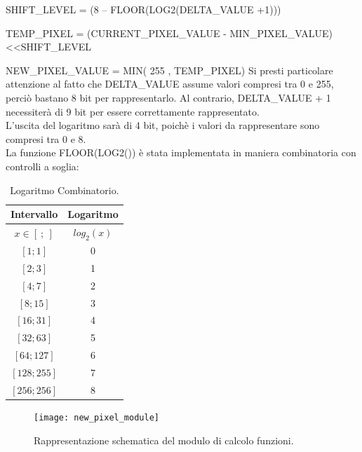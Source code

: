 SHIFT\_LEVEL = (8 – FLOOR(LOG2(DELTA\_VALUE +1)))

TEMP\_PIXEL = (CURRENT\_PIXEL\_VALUE - MIN\_PIXEL\_VALUE) \textless\textless SHIFT\_LEVEL

NEW\_PIXEL\_VALUE = MIN( 255 , TEMP\_PIXEL)
\doublespacing
\singlespacing
Si presti particolare attenzione al fatto che DELTA\_VALUE assume valori compresi tra 0 e 255, perciò bastano 8 bit per rappresentarlo. Al contrario, DELTA\_VALUE + 1 necessiterà di 9 bit per essere correttamente rappresentato.\\
L'uscita del logaritmo sarà di 4 bit, poichè i valori da rappresentare sono compresi tra 0 e 8.\\
La funzione FLOOR(LOG2()) è stata implementata in maniera combinatoria con controlli a soglia:

\begin{table}[h!]
\centering
\begin{tabular}{| c | c |} 
 \hline
 Intervallo & Logaritmo \\
  \hline
 $x \in [~;~]$ & $log_2(x)$ \\ [0.5ex] 
 \hline\hline
 $[1;1]$ & 0 \\ 
 $[2;3]$ & 1 \\
 $[4;7]$ & 2 \\ 
 $[8;15]$ & 3 \\
 $[16;31]$ & 4 \\
 $[32;63]$ & 5 \\
 $[64;127]$ & 6 \\
 $[128;255]$ & 7 \\
 $[256;256]$ & 8 \\ [1ex] 
 \hline
\end{tabular}
\caption{Logaritmo Combinatorio.}
\end{table}

\begin{figure}[h!] %
  \texttt{[image: new\_pixel\_module]}
  \caption{Rappresentazione schematica del modulo di calcolo funzioni.}
  \label{fig:newPixel}
\end{figure}
